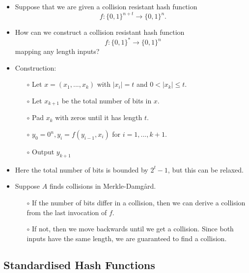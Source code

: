 \documentclass[a4paper]{scrartcl}
\begin{document}
\begin{itemize}
\item Suppose that we are given a collision resistant hash function $$f: \{0,1\}^{n+t} \rightarrow \{0,1\}^n.$$
\item How can we construct a collision resistant hash function $$f: \{0,1\}^* \rightarrow \{0,1\}^n$$ mapping any length inputs?
\item Construction:
\begin{itemize}
\item [$\circ$] Let $x=(x_1, ..., x_k)$ with $|x_i| = t$ and $0<|x_k| \leq t$.
\item [$\circ$] Let $x_{k+1}$ be the total number of bits in $x$.
\item [$\circ$] Pad $x_k$ with zeros until it has length $t$.
\item [$\circ$] $y_0 = 0^n, y_i= f(y_{i-1}, x_i)$ for $i = 1,..., k+1$.
\item [$\circ$] Output $y_{k+1}$
\end{itemize}
\item Here the total number of bits is bounded by $2^t-1$, but this can be relaxed.
\item Suppose $A$ finds collisions in Merkle-Damg\aa rd.
\begin{itemize}
\item [$\circ$] If the number of bits differ in a collision, then we can derive a collision from the last invocation of $f$.
\item [$\circ$] If not, then we move backwards until we get a collision. Since both inputs have the same length, we are guaranteed to find a collision.
\end{itemize}
\end{itemize}

\subsection*{Standardised Hash Functions}
\end{document}
